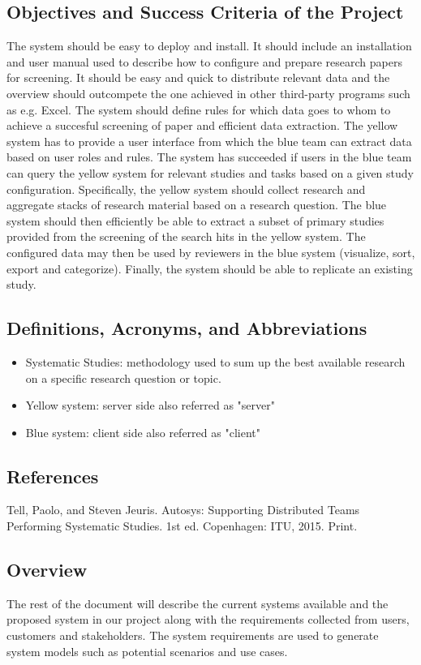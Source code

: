 \subsection{Objectives and Success Criteria of the Project}
The system should be easy to deploy and install. It should include an installation and user manual used to describe how to configure and prepare research papers for screening. It should be easy and quick to distribute relevant data and the overview should outcompete the one achieved in other third-party programs such as e.g. Excel. The system should define rules for which data goes to whom to achieve a succesful screening of paper and efficient data extraction. The yellow system has to provide a user interface from which the blue team can extract data based on user roles and rules. The system has succeeded if users in the blue team can query the yellow system for relevant studies and tasks based on a given study configuration. Specifically, the yellow system should collect research and aggregate stacks of research material based on a research question. The blue system should then efficiently be able to extract a subset of primary studies provided from the screening of the search hits in the yellow system. The configured data may then be used by reviewers in the blue system (visualize, sort, export and categorize). Finally, the system should be able to replicate an existing study.

\subsection{Definitions, Acronyms, and Abbreviations}

	\begin{itemize}
	  \item Systematic Studies: methodology used to sum up the best available research on a specific research question or topic.  
	  \item Yellow system: server side also referred as "server"
	  \item Blue system: client side also referred as "client" 
	\end{itemize}
	
\subsection{References}
Tell, Paolo, and Steven Jeuris. Autosys: Supporting Distributed Teams Performing Systematic Studies. 1st ed. Copenhagen: ITU, 2015. Print.

\subsection{Overview}
The rest of the document will describe the current systems available and the proposed system in our project along with the requirements collected from users, customers and stakeholders. The system requirements are used to generate system models such as potential scenarios and use cases. 
